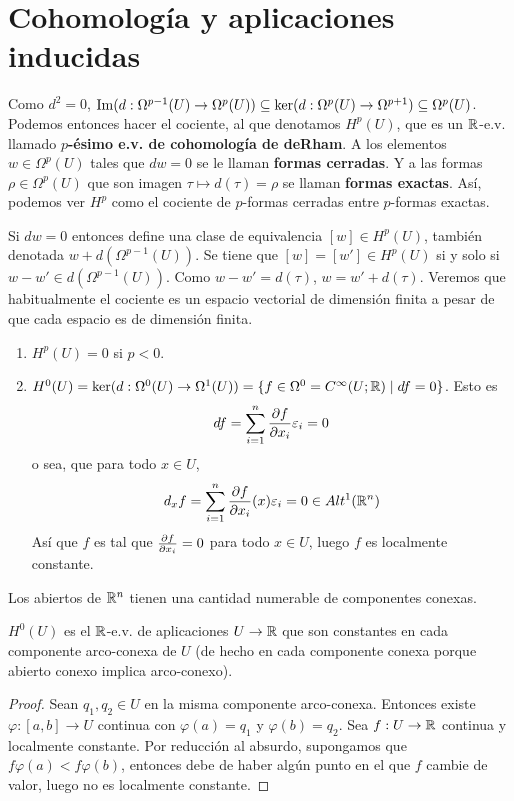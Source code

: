 \documentclass[CV.tex]{subfiles}
\begin{document}
\section{Cohomología y aplicaciones inducidas}\label{inducida}


Como $d^2=0$, $\operatorname{Im}(d:\Omega^{p-1}(U)\to\Omega^p(U))\subseteq\ker(d:\Omega^p(U)\to\Omega^{p+1})\subseteq\Omega^p(U)$. Podemos entonces hacer el cociente, al que denotamos $H^p(U)$, que es un $\mathbb{R}$-e.v. llamado \textbf{$p$-ésimo e.v. de cohomología de deRham}. A los elementos $w\in\Omega^p(U)$ tales que $dw=0$ se le llaman \textbf{formas cerradas}. Y a las formas $\rho\in\Omega^p(U)$ que son imagen $\tau\mapsto d(\tau)=\rho$ se llaman \textbf{formas exactas}. Así, podemos ver $H^p$ como el cociente de $p$-formas cerradas entre $p$-formas exactas. 

Si $dw=0$ entonces define una clase de equivalencia $[w]\in H^p(U)$, también denotada $w+d(\Omega^{p-1}(U))$. Se tiene que $[w]=[w']\in H^p(U)$ si y solo si $w-w'\in d(\Omega^{p-1}(U))$. Como $w-w'=d(\tau)$, $w=w'+d(\tau)$. Veremos que habitualmente el cociente es un espacio vectorial de dimensión finita a pesar de que cada espacio es de dimensión finita. 

\begin{ej}
\begin{enumerate}
\item $H^p(U)=0$ si $p<0$.
\item $H^0(U)=\ker(d:\Omega^0(U)\to\Omega^1(U))=\{f\in\Omega^0=C^{\infty}(U;\mathbb{R})\mid df=0\}$. Esto es
\[
df=\sum_{i=1}^n\frac{\partial f}{\partial x_i}\varepsilon_i=0
\]
o sea, que para todo $x\in U$,
\[
d_xf=\sum_{i=1}^n\frac{\partial f}{\partial x_i}(x)\varepsilon_i=0\in Alt^1(\mathbb{R}^n)
\]
Así que $f$ es tal que $\frac{\partial f}{\partial x_i}=0$ para todo $x\in U$, luego $f$ es localmente constante.
\end{enumerate}
\end{ej}

\begin{nota}
Los abiertos de $\mathbb{R}^n$ tienen una cantidad numerable de componentes conexas. 
\end{nota}


\begin{lemma}
$H^0(U)$ es el $\mathbb{R}$-e.v. de aplicaciones $U\to\mathbb{R}$ que son constantes en cada componente arco-conexa de $U$ (de hecho en cada componente conexa porque abierto conexo implica arco-conexo). 
\end{lemma}
\begin{proof}
Sean $q_1,q_2\in U$ en la misma componente arco-conexa. Entonces existe $\varphi:[a,b]\to U$ continua con $\varphi(a)=q_1$ y $\varphi(b)=q_2$. Sea $f:U\to \mathbb{R}$ continua y localmente constante. Por reducción al absurdo, supongamos que $f\varphi(a)<f\varphi(b)$, entonces debe de haber algún punto en el que $f$ cambie de valor, luego no es localmente constante.
\end{proof}
\end{document}
